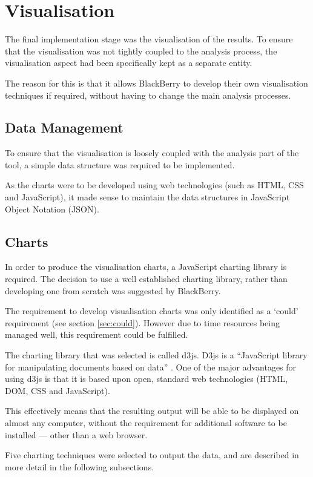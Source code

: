 \section{Visualisation}
The final implementation stage was the visualisation of the results. To ensure 
that the visualisation was not tightly coupled to the analysis process, the 
visualisation aspect had been specifically kept as a separate entity.

The reason for this is that it allows BlackBerry to develop their own 
visualisation techniques if required, without having to change the main 
analysis processes.

\subsection{Data Management}
To ensure that the visualisation is loosely coupled with the analysis part of 
the tool, a simple data structure was required to be implemented.

As the charts were to be developed using web technologies (such as HTML, CSS 
and JavaScript), it made sense to maintain the data structures in JavaScript 
Object Notation (JSON).

\subsection{Charts}
In order to produce the visualisation charts, a JavaScript charting library is
required. The decision to use a well established charting library, rather than 
developing one from scratch was suggested by BlackBerry.

The requirement to develop visualisation charts was only identified as a 
`could' requirement (see section \ref{sec:could}). However due to time 
resources being managed well, this requirement could be fulfilled.

The charting library that was selected is called d3js. D3js is a ``JavaScript 
library for manipulating documents based on data'' \citep{d3js}. One of the 
major advantages for using d3js is that it is based upon open, standard web 
technologies (HTML, DOM, CSS and JavaScript).

This effectively means that the resulting output will be able to be displayed 
on almost any computer, without the requirement for additional software to be
installed --- other than a web browser.

Five charting techniques were selected to output the data, and are described in
more detail in the following subsections.



